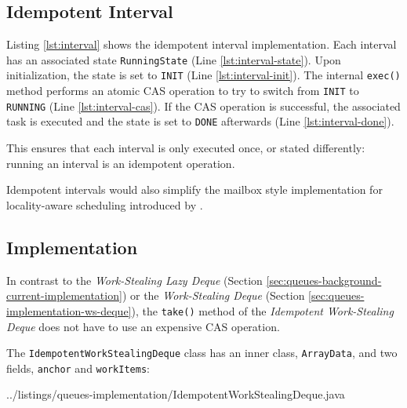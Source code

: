 \subsection{Idempotent Interval}
\label{sec:queues-implementation-idempotent-ws-deque-interval}

Listing \ref{lst:interval} shows the idempotent interval
implementation. Each interval has an associated state
\lstinline!RunningState! (Line \ref{lst:interval-state}). Upon
initialization, the state is set to \lstinline!INIT! (Line
\ref{lst:interval-init}). The internal \lstinline!exec()!  method
performs an atomic CAS operation to try to switch from
\lstinline!INIT! to \lstinline!RUNNING! (Line
\ref{lst:interval-cas}). If the CAS operation is successful, the
associated task is executed and the state is set to \lstinline!DONE!
afterwards (Line \ref{lst:interval-done}).



This ensures that each interval is only executed once, or stated
differently: running an interval is an idempotent operation.

Idempotent intervals would also simplify the mailbox style
implementation for locality-aware scheduling introduced by
\textcite{Acar2000}.

\subsection{Implementation}
\label{sec:queues-implementation-idempotent-ws-deque-implementation}

In contrast to the \emph{Work-Stealing Lazy Deque} (Section
\ref{sec:queues-background-current-implementation}) or the
\emph{Work-Stealing Deque} (Section
\ref{sec:queues-implementation-ws-deque}), the \lstinline!take()!
method of the \emph{Idempotent Work-Stealing Deque} does not have to
use an expensive CAS operation.

The \lstinline!IdempotentWorkStealingDeque! class has an inner class,
\lstinline!ArrayData!, and two fields, \lstinline!anchor! and
\lstinline!workItems!:


{
    ../listings/queues-implementation/IdempotentWorkStealingDeque.java
}

